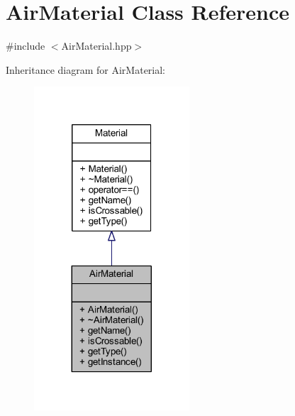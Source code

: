 \hypertarget{class_air_material}{}\section{Air\+Material Class Reference}
\label{class_air_material}


{\ttfamily \#include $<$Air\+Material.\+hpp$>$}



Inheritance diagram for Air\+Material\+:\nopagebreak
\begin{figure}[H]
\begin{center}
\leavevmode
\includegraphics[width=164pt]{class_air_material__inherit__graph}
\end{center}
\end{figure}


